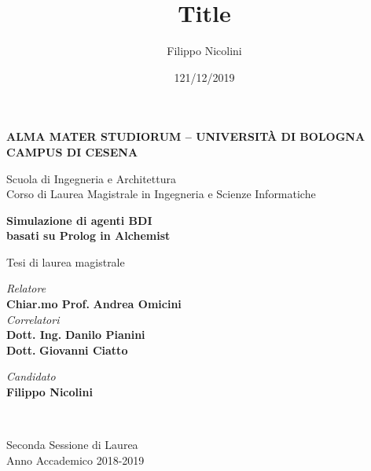 \title{Title}
\author{Filippo Nicolini}
\date{121/12/2019}

\begin{titlepage}
    \begin{center}
        
        \large
        \textbf{ALMA MATER STUDIORUM -- UNIVERSITÀ DI BOLOGNA \\ CAMPUS DI CESENA}
    	\\
        \noindent\hrulefill
        \vspace{0.4cm}
        
        \Large
        Scuola di Ingegneria e Architettura \\
        Corso di Laurea Magistrale in Ingegneria e Scienze Informatiche
        
        \Huge
        \vspace{4cm}
        \textbf{Simulazione di agenti BDI\\
        basati su Prolog in Alchemist}

        \large
        \vspace{1cm}
        Tesi di laurea magistrale
        
        \vspace{5.5cm}
        \begin{minipage}[t]{0.64\textwidth}
            \begin{flushleft}
                \textit{Relatore} 
                \\ 
                \textbf{Chiar.mo Prof.} \textbf{Andrea Omicini} 
                \\
                \vspace{0.4cm}
                \textit{Correlatori} 
                \\ 
                \textbf{Dott. Ing.} \textbf{Danilo Pianini}
                \\
                \textbf{Dott.} \textbf{Giovanni Ciatto}
            \end{flushleft}
        \end{minipage}
        \begin{minipage}[t]{0.34\textwidth}
            \begin{flushright}
                \textit{Candidato} 
                \\ 
                \textbf{Filippo Nicolini}
            \end{flushright}
        \end{minipage}\\
        
        \vfill
        \noindent\hrulefill
        \vspace{0.3cm}
        \Large
        
        Seconda Sessione di Laurea
        \\
        Anno Accademico 2018-2019
    \end{center}
\end{titlepage}
\restoregeometry
